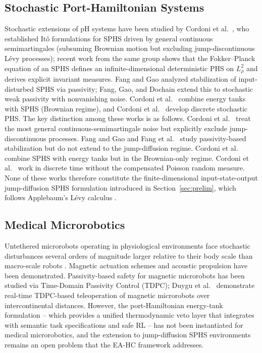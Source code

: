 \documentclass[11pt]{article}
\begin{document}
\subsection{Stochastic Port-Hamiltonian Systems}
\label{sec:related-sphs}

Stochastic extensions of pH systems have been studied by Cordoni et al.\ \cite{cordoni2022},
who established It\^{o} formulations for SPHS driven by general continuous semimartingales
(subsuming Brownian motion but excluding jump-discontinuous L\'{e}vy processes); recent work
from the same group \cite{cordoni2025} shows that the Fokker--Planck equation of an SPHS
defines an infinite-dimensional deterministic PHS on $L^2_\rho$ and derives explicit invariant
measures. Fang and Gao \cite{fang2017} analyzed stabilization of input-disturbed SPHS via
passivity; Fang, Gao, and Dochain \cite{fang2023} extend this to stochastic weak passivity
with nonvanishing noise. Cordoni et al.\ \cite{cordoni2021} combine energy tanks with SPHS
(Brownian regime), and Cordoni et al.\ \cite{cordoni2022b} develop discrete stochastic PHS.
The key distinction among these works is as follows. Cordoni et al.\ \cite{cordoni2022} treat
the most general continuous-semimartingale noise but explicitly exclude jump-discontinuous
processes. Fang and Gao \cite{fang2017} and Fang et al.\ \cite{fang2023} study
passivity-based stabilization but do not extend to the jump-diffusion regime. Cordoni et al.\
\cite{cordoni2021} combine SPHS with energy tanks but in the Brownian-only regime.
Cordoni et al.\ \cite{cordoni2022b} work in discrete time without the compensated Poisson
random measure. None of these works therefore constitute the finite-dimensional
input-state-output jump-diffusion SPHS formulation introduced in Section~\ref{sec:prelim},
which follows Applebaum's L\'{e}vy calculus \cite{applebaum2009}.

\subsection{Medical Microrobotics}

Untethered microrobots operating in physiological environments face stochastic disturbances
several orders of magnitude larger relative to their body scale than macro-scale robots
\cite{sitti2018,nelson2010}. Magnetic actuation schemes \cite{sitti2018} and acoustic
propulsion \cite{ahmed2017} have been demonstrated. Passivity-based safety for magnetic
microrobots has been studied via Time-Domain Passivity Control (TDPC); Duygu et al.\
\cite{duygu2025} demonstrate real-time TDPC-based teleoperation of magnetic microrobots
over intercontinental distances. However, the port-Hamiltonian energy-tank formulation --
which provides a unified thermodynamic veto layer that integrates with semantic task
specifications and safe RL -- has not been instantiated for medical microrobotics, and the
extension to jump-diffusion SPHS environments remains an open problem that the EA-HC
framework addresses.
\end{document}
